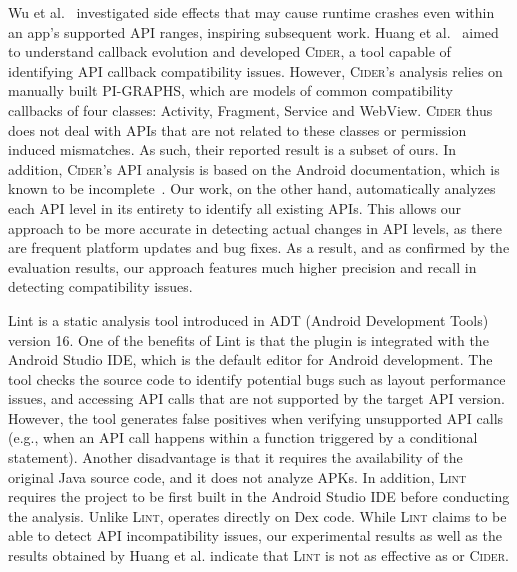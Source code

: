 Wu et al.~\cite{wu2017measuring} investigated side
effects that may cause runtime crashes even within an
app's supported API ranges, inspiring subsequent work.
%
Huang et al.~\cite{huang2018understanding} aimed to
understand callback evolution and developed
\textsc{Cider}, a tool capable of identifying API
callback compatibility issues. However,
\textsc{Cider}'s analysis relies on manually built
PI-GRAPHS, which are models of common compatibility
callbacks of four classes: Activity, Fragment, Service
and WebView. \textsc{Cider} thus does not deal with
APIs that are not related to these classes or
permission induced mismatches. 
As such, their reported result is a subset of ours. In
addition, \textsc{Cider}'s API analysis is based on the
Android documentation, which is known to be
incomplete~\cite{wu2017measuring}. Our work, on the
other hand, automatically analyzes each API level in
its entirety to identify all existing APIs. This allows
our approach to be more accurate in detecting actual
changes in API levels, as there are frequent platform
updates and bug fixes. As a result, and as confirmed by
the evaluation results, our approach features much
higher precision and recall in detecting compatibility
issues.

Lint \cite{linttips} is a static analysis tool
introduced in ADT (Android Development Tools) version
16. One of the benefits of Lint is that the plugin is
integrated with the Android Studio IDE, which is the
default editor for Android development. The tool checks
the source code to identify potential bugs such as
layout performance issues, and accessing API calls that
are not supported by the target API version. However,
the tool generates false positives when verifying
unsupported API calls (e.g., when an API call happens
within a function triggered by a conditional
statement). Another disadvantage is that it requires
the availability of the original Java source code, and
it does not analyze APKs.  In addition, \textsc{Lint}
requires the project to be first built in the Android
Studio IDE before conducting the analysis.  Unlike
\textsc{Lint}, \@approach operates directly on Dex
code. While \textsc{Lint} claims to be able to detect
API incompatibility issues, our experimental results as
well as the results obtained by Huang et al.  indicate
that \textsc{Lint} is not as effective as \@approach or
\textsc{Cider}.

